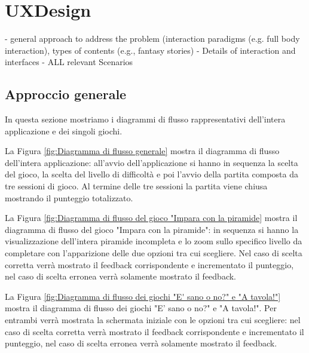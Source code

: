 \section{UXDesign} \label{sec:design}

- general approach to address the problem (interaction paradigms (e.g. full body interaction), types of contents
(e.g., fantasy stories)
- Details of interaction and interfaces
- ALL relevant Scenarios

\subsection{Approccio generale} \label{subsec:app}
In questa sezione mostriamo i diagrammi di flusso rappresentativi dell'intera applicazione e dei singoli giochi.

La Figura \ref{fig:Diagramma di flusso generale} mostra il diagramma di flusso dell'intera applicazione: all'avvio dell'applicazione si hanno in sequenza la scelta del gioco, la scelta del livello di difficoltà e poi l'avvio della partita composta da tre sessioni di gioco. Al termine delle tre sessioni la partita viene chiusa mostrando il punteggio totalizzato.

La Figura \ref{fig:Diagramma di flusso del gioco "Impara con la piramide} mostra il diagramma di flusso del gioco "Impara con la piramide": in sequenza si hanno la visualizzazione dell'intera piramide incompleta e lo zoom sullo specifico livello da completare con l'apparizione delle due opzioni tra cui scegliere. Nel caso di scelta corretta verrà mostrato il feedback corrispondente e incrementato il punteggio, nel caso di scelta erronea verrà solamente mostrato il feedback.

La Figura \ref{fig:Diagramma di flusso dei giochi "E' sano o no?" e "A tavola!"} mostra il diagramma di flusso dei giochi "E' sano o no?" e "A tavola!". Per entrambi verrà mostrata la schermata iniziale con le opzioni tra cui scegliere: nel caso di scelta corretta verrà mostrato il feedback corrispondente e incrementato il punteggio, nel caso di scelta erronea verrà solamente mostrato il feedback.

